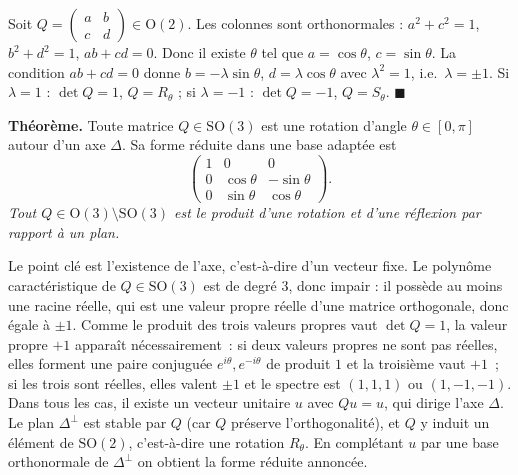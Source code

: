 \begin{mdframed}[style=proofbar]
  Soit $Q=\begin{pmatrix}a&b\\c&d\end{pmatrix}\in\mathrm{O}(2)$.
  Les colonnes sont orthonormales : $a^2+c^2=1$, $b^2+d^2=1$, $ab+cd=0$.
  Donc il existe $\theta$ tel que $a=\cos\theta$, $c=\sin\theta$.
  La condition $ab+cd=0$ donne $b=-\lambda\sin\theta$, $d=\lambda\cos\theta$
  avec $\lambda^2=1$, i.e.\ $\lambda=\pm 1$.
  Si $\lambda=1$ : $\det Q=1$, $Q=R_\theta$ ; si $\lambda=-1$ : $\det Q=-1$, $Q=S_\theta$. \hfill$\blacksquare$
\end{mdframed}


\begin{tcolorbox}[thmbox]
  \textbf{Théorème.}\enspace%
  Toute matrice $Q \in \mathrm{SO}(3)$ est une rotation d'angle $\theta \in [0,\pi]$
  autour d'un axe $\Delta$. Sa forme réduite dans une base adaptée est
  \[
    \begin{pmatrix}1&0&0\\0&\cos\theta&-\sin\theta\\0&\sin\theta&\cos\theta\end{pmatrix}.
  \]
  \textit{Tout $Q\in\mathrm{O}(3)\setminus\mathrm{SO}(3)$ est le produit d'une
  rotation et d'une réflexion par rapport à un plan.}
\end{tcolorbox}

\begin{ideepreuve}
  Le point clé est l'existence de l'axe, c'est-à-dire d'un vecteur fixe.
  Le polynôme caractéristique de $Q\in\mathrm{SO}(3)$ est de degré $3$, donc impair :
  il possède au moins une racine réelle, qui est une valeur propre réelle d'une
  matrice orthogonale, donc égale à $\pm 1$. Comme le produit des trois valeurs
  propres vaut $\det Q=1$, la valeur propre $+1$ apparaît nécessairement~: si deux
  valeurs propres ne sont pas réelles, elles forment une paire conjuguée
  $e^{i\theta},e^{-i\theta}$ de produit $1$ et la troisième vaut $+1$~; si les trois
  sont réelles, elles valent $\pm 1$ et le spectre est $(1,1,1)$ ou $(1,-1,-1)$.
  Dans tous les cas, il existe un vecteur unitaire $u$ avec $Qu=u$,
  qui dirige l'axe $\Delta$. Le plan $\Delta^\perp$ est stable par $Q$ (car $Q$
  préserve l'orthogonalité), et $Q$ y induit un élément de $\mathrm{SO}(2)$, c'est-à-dire
  une rotation $R_\theta$. En complétant $u$ par une base orthonormale de $\Delta^\perp$
  on obtient la forme réduite annoncée.
\end{ideepreuve}

